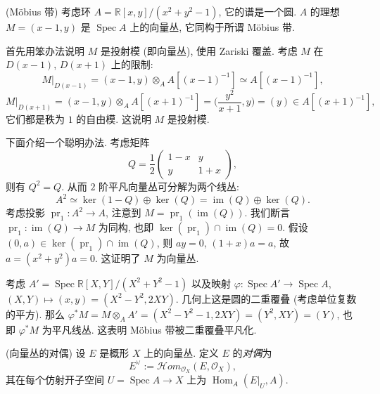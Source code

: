 \documentclass{book}
\newcommand{\internalhom}{\mathcal{H}om}
\begin{document}
	\begin{example}
		{(M\"obius 带)}
		考虑环 $A=\mathbb{R}[x,y]/(x^2+y^2-1)$, 它的谱是一个圆.
		$A$ 的理想 $M = (x-1,y)$ 是 $\operatorname{Spec} A$ 上的向量丛, 它同构于所谓 M\"obius 带.
		
		首先用笨办法说明 $M$ 是投射模 (即向量丛), 使用 Zariski 覆盖. 考虑 $M$ 在 $D(x-1)$, $D(x+1)$ 上的限制:
		$$
		M|_{D(x-1)} = (x-1,y) \otimes_A A[(x-1)^{-1}] \simeq A[(x-1)^{-1}],
		$$
		$$
		M|_{D(x+1)} = (x-1,y) \otimes_A A[(x+1)^{-1}] = \Big(\frac{y^2}{x+1},y\Big) = (y)\in A[(x+1)^{-1}],
		$$
		它们都是秩为 $1$ 的自由模. 这说明 $M$ 是投射模.
		
		
		下面介绍一个聪明办法. 考虑矩阵
		$$
		Q = \frac{1}{2}\begin{pmatrix}
			1-x & y\\
			y & 1+x
		\end{pmatrix},
		$$
		则有
		$Q^2=Q$. 从而 $2$ 阶平凡向量丛可分解为两个线丛: $$A^2\simeq \ker(1-Q)\oplus\ker(Q) = \operatorname{im}(Q)\oplus\ker(Q).$$ 考虑投影 $\operatorname{pr}_1\colon A^2\to A$, 注意到 $M=\operatorname{pr}_1(\operatorname{im}(Q))$. 我们断言 $\operatorname{pr}_1\colon \operatorname{im}(Q)\to M$ 为同构, 也即 $\ker(\operatorname{pr}_1) \cap \operatorname{im}(Q) = 0$. 假设 $(0,a)\in \ker(\operatorname{pr}_1) \cap \operatorname{im}(Q)$, 则 $ay=0$, $(1+x)a=a$, 故 $a=(x^2+y^2)a=0$. 这证明了 $M$ 为向量丛.
		
		考虑 $A'=\operatorname{Spec} \mathbb{R}[X,Y]/(X^2+Y^2-1)$ 以及映射 $\varphi\colon \operatorname{Spec} A'\to\operatorname{Spec} A$, $(X,Y)\mapsto (x,y)=(X^2-Y^2,2XY)$. 几何上这是圆的二重覆叠 (考虑单位复数的平方).
		那么 $\varphi^*M = M\otimes_A A' = (X^2-Y^2-1,2XY) = (Y^2,XY)=(Y)$, 也即 $\varphi^*M$ 为平凡线丛. 这表明 M\"obius 带被二重覆叠平凡化.
	\end{example}
	
	\begin{definition}
		{(向量丛的对偶)}
		设 $E$ 是概形 $X$ 上的向量丛. 定义 $E$ 的\emph{对偶}为
		$$E^{\vee} := \internalhom_{\mathcal O_X}(E,\mathcal O_X),$$
		其在每个仿射开子空间 $U=\operatorname{Spec} A\to X$ 上为 $\operatorname{Hom}_A(E|_U,A)$.
	\end{definition}
	
\end{document}
